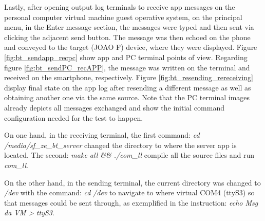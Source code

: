Lastly, after opening output log terminals to receive app messages on the personal computer virtual machine guest operative system, on the principal menu, in the Enter message section, the messages were typed and then sent via clicking the adjacent send button. The message was then echoed on the phone and conveyed to the target (JOAO F) device, where they were displayed. Figure \ref{fig:bt_sendapp_recpc} show app and PC terminal points of view. Regarding figure \ref{fig:bt_sendPC_recAPP}, the message was written on the terminal and received on the smartphone, respectively. Figure \ref{fig:bt_resending_rereceiving} display final state on the app log after resending a different message as well as obtaining another one via the same source. Note that the PC terminal images already depicts all messages exchanged and show the initial command configuration needed for the test to happen.

On one hand, in the receiving terminal, the first command:  \emph{cd} \emph{/media/sf\_ze\_bt\_server}
changed the directory to where the server app is located. The second:  \emph{make all \&\& ./com\_ll} compile all the source files and run \emph{com\_ll}.

On the other hand, in the sending terminal, the current directory was changed to \emph{/dev} with the command:  \emph{cd}  \emph{/dev}
to navigate to where virtual COM4 (ttyS3) so that messages could be sent through, as exemplified in the instruction:  \emph{echo Msg da VM}  \emph{> ttyS3}.